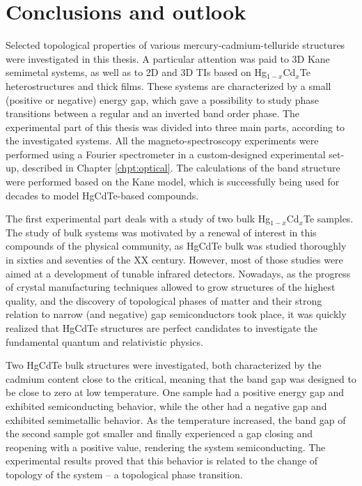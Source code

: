 \documentclass[titlepage,a4paper]{book}
\newcommand{\wciecie}{\quad\phantom{v}}
\begin{document}
\chapter{Conclusions and outlook}
\wciecie
Selected topological properties of various mercury-cadmium-telluride structures were investigated in this thesis. A particular attention was paid to 3D Kane semimetal systems, as well as to 2D and 3D TIs based on Hg$_{1-x}$Cd$_{x}$Te heterostructures and thick films. These systems are characterized by a small (positive or negative) energy gap, which gave a possibility to study phase transitions between a regular and an inverted band order phase. The experimental part of this thesis was divided into three main parts, according to the investigated systems. All the magneto-spectroscopy experiments were performed using a Fourier spectrometer in a custom-designed experimental set-up, described in Chapter \ref{chpt:optical}. The calculations of the band structure were performed based on the Kane model, which is successfully being used for decades to model HgCdTe-based compounds.
\vspace{5mm}

The first experimental part deals with a study of two bulk Hg$_{1-x}$Cd$_{x}$Te samples. The study of bulk systems was motivated by a renewal of interest in this compounds of the physical community, as HgCdTe bulk was studied thoroughly in sixties and seventies of the XX century. However, most of those studies were aimed at a development of tunable infrared detectors. Nowadays, as the progress of crystal manufacturing techniques allowed to grow structures of the highest quality, and the discovery of topological phases of matter and their strong relation to narrow (and negative) gap semiconductors took place, it was quickly realized that HgCdTe structures are perfect candidates to investigate the fundamental quantum and relativistic physics. 

Two HgCdTe bulk structures were investigated, both characterized by the cadmium content close to the critical, meaning that the band gap was designed to be close to zero at low temperature. One sample had a positive energy gap and exhibited semiconducting behavior, while the other had a negative gap and exhibited semimetallic behavior. As the temperature increased, the band gap of the second sample got smaller and finally experienced a gap closing and reopening with a positive value, rendering the system semiconducting. The experimental results proved that this behavior is related to the change of topology of the system -- a topological phase transition.
\end{document}
